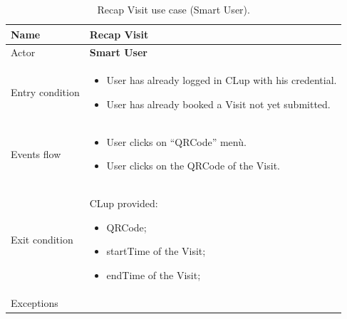 \begin{table}[H]\begin{tabular}{|p{5cm} | p{7cm} | }
	\hline
	Name & \textbf{Recap Visit} \\
	\hline
	Actor & \textbf{Smart User} \\
	\hline
	Entry condition &
    \begin{itemize}
	    \item User has already logged in CLup with his credential. 
		\item User has already booked a Visit not yet submitted.
        \end{itemize}\\
	\hline
	Events flow & \begin{itemize}
	\item User clicks on “QRCode” menù.
    \item User clicks on the QRCode of the Visit.
    \end{itemize}\\
	\hline
	Exit condition & CLup provided:
    \begin{itemize}
    \item QRCode;
    \item startTime of the Visit;
    \item endTime of the Visit;
    \end{itemize}\\
	\hline 
	Exceptions & \\
	\hline
\end{tabular}
\caption{Recap Visit use case (Smart User).}
\end{table}

\bigbreak

